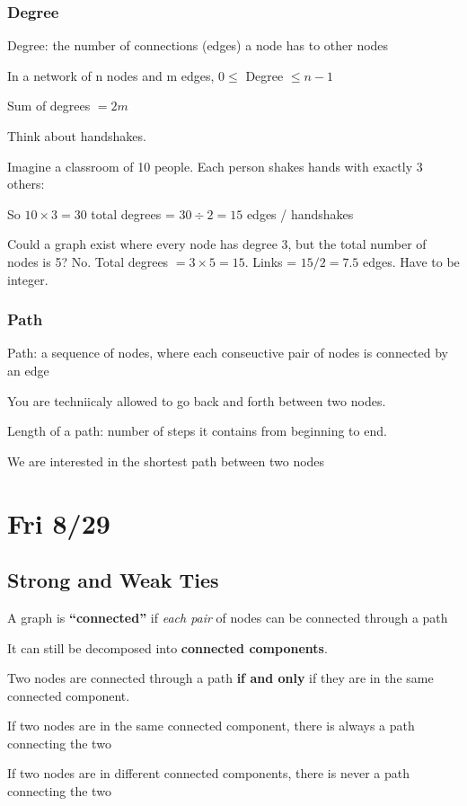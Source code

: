 \documentclass[14pt, letterpaper, oneside]{extarticle}
\begin{document}
\subsubsection{Degree}
Degree: the number of connections (edges) a node has to other nodes

In a network of n nodes and m edges, $0 \leq$ Degree $\leq n - 1$

Sum of degrees $= 2m$

Think about handshakes. 

Imagine a classroom of 10 people. Each person shakes hands with exactly 3 others:

So $10 \times 3 = 30$ total degrees = $30 \div 2 = 15$ edges / handshakes

Could a graph exist where every node has degree 3, but the total number of nodes is 5?
No. Total degrees $= 3 \times 5 = 15$. Links = $15 / 2 = 7.5$ edges. Have to be integer.

\subsubsection{Path}
Path: a sequence of nodes, where each conseuctive pair of nodes is connected by an edge

You are techniicaly allowed to go back and forth between two nodes.

Length of a path: number of steps it contains from beginning to end.

We are interested in the shortest path between two nodes

\section{Fri 8/29}
\subsection{Strong and Weak Ties}
A graph is \textbf{``connected''} if \textit{each pair} of nodes can be connected through a path

It can still be decomposed into \textbf{connected components}.

Two nodes are connected through a path \textbf{if and only} if they are in the same connected component.

If two nodes are in the same connected component, there is always a path connecting the two

If two nodes are in different connected components, there is never a path connecting the two
\end{document}
